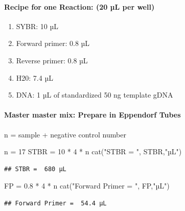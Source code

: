 \documentclass[
]{article}
\newenvironment{Shaded}{\begin{snugshade}}{\end{snugshade}}
\newcommand{\DecValTok}[1]{\textcolor[rgb]{0.00,0.00,0.81}{#1}}
\newcommand{\FloatTok}[1]{\textcolor[rgb]{0.00,0.00,0.81}{#1}}
\newcommand{\FunctionTok}[1]{\textcolor[rgb]{0.00,0.00,0.00}{#1}}
\newcommand{\NormalTok}[1]{#1}
\newcommand{\OtherTok}[1]{\textcolor[rgb]{0.56,0.35,0.01}{#1}}
\newcommand{\SpecialCharTok}[1]{\textcolor[rgb]{0.00,0.00,0.00}{#1}}
\newcommand{\StringTok}[1]{\textcolor[rgb]{0.31,0.60,0.02}{#1}}
\providecommand{\tightlist}{%
  \setlength{\itemsep}{0pt}\setlength{\parskip}{0pt}}
\begin{document}
\hypertarget{recipe-for-one-reaction-20-uxb5l-per-well}{%
\paragraph{Recipe for one Reaction: (20 µL per
well)}\label{recipe-for-one-reaction-20-uxb5l-per-well}}

\begin{enumerate}
\def\labelenumi{\arabic{enumi}.}
\tightlist
\item
  SYBR: 10 µL
\item
  Forward primer: 0.8 µL
\item
  Reverse primer: 0.8 µL
\item
  H20: 7.4 µL
\item
  DNA: 1 µL of standardized 50 ng template gDNA
\end{enumerate}

\hypertarget{master-master-mix-prepare-in-eppendorf-tubes}{%
\paragraph{Master master mix: Prepare in Eppendorf
Tubes}\label{master-master-mix-prepare-in-eppendorf-tubes}}

n = sample + negative control number

\begin{Shaded}
\begin{Highlighting}[]
\NormalTok{n }\OtherTok{=} \DecValTok{17}
\NormalTok{STBR }\OtherTok{=} \DecValTok{10} \SpecialCharTok{*} \DecValTok{4} \SpecialCharTok{*}\NormalTok{ n}
\FunctionTok{cat}\NormalTok{(}\StringTok{"STBR = "}\NormalTok{, STBR,}\StringTok{"µL"}\NormalTok{)}
\end{Highlighting}
\end{Shaded}

\begin{verbatim}
## STBR =  680 µL
\end{verbatim}

\begin{Shaded}
\begin{Highlighting}[]
\NormalTok{FP }\OtherTok{=} \FloatTok{0.8} \SpecialCharTok{*} \DecValTok{4} \SpecialCharTok{*}\NormalTok{ n}
\FunctionTok{cat}\NormalTok{(}\StringTok{"Forward Primer = "}\NormalTok{, FP,}\StringTok{"µL"}\NormalTok{)}
\end{Highlighting}
\end{Shaded}

\begin{verbatim}
## Forward Primer =  54.4 µL
\end{verbatim}
\end{document}
